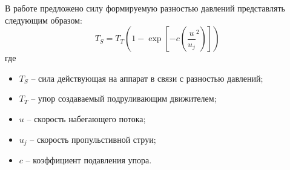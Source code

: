




В работе \cite{palmer2009analysis} предложено силу формируемую разностью давлений представлять следующим образом:
\begin{equation}
    \label{eq:thrust_tunnel}
	T_S = T_T (1 - \exp \left[ -c \left( \frac{u}{u_j}^2 \right) \right])
\end{equation}
\noindent где
\begin{itemize}
	\item $T_S$ -- сила действующая на аппарат в связи с разностью давлений;
	\item $T_T$ -- упор создаваемый подруливающим движителем;
	\item $u$ -- скорость набегающего потока;
	\item $u_j$ -- скорость пропульстивной струи;
	\item $c$ -- коэффициент подавления упора.
\end{itemize}

